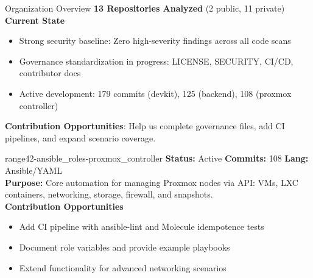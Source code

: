 \documentclass[aspectratio=169]{beamer}
\begin{document}
\begin{frame}[squeeze]{Organization Overview \; \faClipboardCheck}
  \textbf{13 Repositories Analyzed} (2 public, 11 private)\\[2mm]
  
  \textbf{Current State}
  \begin{itemize}
    \item \alert{Strong security baseline}: Zero high-severity findings across all code scans
    \item \alert{Governance standardization in progress}: LICENSE, SECURITY, CI/CD, contributor docs
    \item \alert{Active development}: 179 commits (devkit), 125 (backend), 108 (proxmox controller)
  \end{itemize}
  \vspace{1mm}
  \begin{tcolorbox}
    \faUsers\; \textbf{Contribution Opportunities}: Help us complete governance files, add CI pipelines, and expand scenario coverage.
  \end{tcolorbox}
\end{frame}

\begin{frame}[squeeze]{range42-ansible\_roles-proxmox\_controller \; \faCogs}
  \textbf{Status:} Active \hfill \textbf{Commits:} 108 \hfill \textbf{Lang:} Ansible/YAML\\[2mm]
  \textbf{Purpose:} Core automation for managing Proxmox nodes via API: VMs, LXC containers, networking, storage, firewall, and snapshots.\\[2mm]
  \textbf{Contribution Opportunities}
  \begin{itemize}
    \item Add CI pipeline with ansible-lint and Molecule idempotence tests
    \item Document role variables and provide example playbooks
    \item Extend functionality for advanced networking scenarios
  \end{itemize}
\end{frame}
\end{document}
